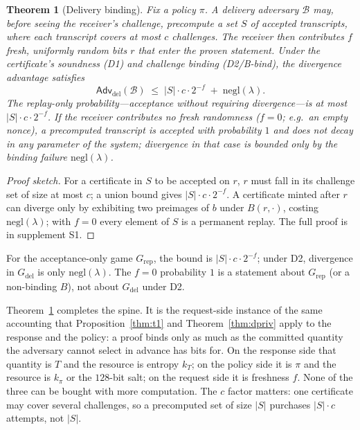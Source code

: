 \documentclass[10pt,journal,compsoc]{IEEEtran}
\newtheorem{theorem}{Theorem}
\begin{document}
\begin{theorem}[Delivery binding]
\label{thm:t3}
Fix a policy $\pi$. A delivery adversary $\mathcal{B}$ may, \emph{before}
seeing the receiver's challenge, precompute a set $S$ of accepted transcripts,
where each transcript covers at most $c$ challenges. The receiver then
contributes $f$ fresh, uniformly random bits $r$ that enter the proven
statement. Under the certificate's soundness (D1) and challenge binding
(D2/B-bind), the divergence advantage satisfies
\[
\mathsf{Adv}_{\mathrm{del}}(\mathcal{B}) \;\le\; |S| \cdot c \cdot 2^{-f}
\;+\; \mathrm{negl}(\lambda).
\]
The replay-only probability---acceptance without requiring divergence---is at
most $|S|\cdot c\cdot 2^{-f}$. If the receiver contributes no fresh randomness
($f = 0$; e.g.\ an empty nonce), a precomputed transcript is accepted with
probability $1$ and \emph{does not decay in any parameter of the system};
divergence in that case is bounded only by the binding failure
$\mathrm{negl}(\lambda)$.
\end{theorem}
\begin{proof}[Proof sketch]
For a certificate in $S$ to be accepted on $r$, $r$ must fall in its challenge
set of size at most $c$; a union bound gives $|S|\cdot c\cdot2^{-f}$. A
certificate minted after $r$ can diverge only by exhibiting two preimages of $b$
under $B(r,\cdot)$, costing $\mathrm{negl}(\lambda)$; with $f=0$ every element of
$S$ is a permanent replay. The full proof is in supplement S1.
\end{proof}

For the acceptance-only game $G_{\mathrm{rep}}$, the bound is
$|S|\cdot c\cdot2^{-f}$; under D2, divergence in $G_{\mathrm{del}}$ is only
$\mathrm{negl}(\lambda)$. The $f=0$ probability $1$ is a statement about
$G_{\mathrm{rep}}$ (or a non-binding $B$), not about $G_{\mathrm{del}}$ under
D2.

Theorem~\ref{thm:t3} completes the spine. It is the request-side instance of the
same accounting that Proposition~\ref{thm:t1} and Theorem~\ref{thm:dpriv} apply
to the response and the policy: a proof binds only as much as the committed
quantity the adversary cannot select in advance has bits for. On the response
side that quantity is $T$ and the resource is entropy $k_T$; on the policy side
it is $\pi$ and the resource is $k_\pi$ or the $128$-bit salt; on the request
side it is freshness $f$. None of the three can be bought with more computation.
The $c$ factor matters: one certificate may cover several challenges, so a
precomputed set of size $|S|$ purchases $|S|\cdot c$ attempts, not $|S|$.
\end{document}
